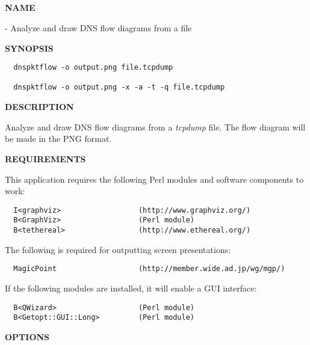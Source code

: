 \clearpage

\subsection{}

{\bf NAME}

 - Analyze and draw DNS flow diagrams from a  file

{\bf SYNOPSIS}

\begin{verbatim}
  dnspktflow -o output.png file.tcpdump

  dnspktflow -o output.png -x -a -t -q file.tcpdump
\end{verbatim}

{\bf DESCRIPTION}

Analyze and draw DNS flow diagrams from a {\it tcpdump} file.
The flow diagram will be made in the PNG format.

{\bf REQUIREMENTS}

This application requires the following Perl modules and software
components to work:

\begin{verbatim}
  I<graphviz>                  (http://www.graphviz.org/)
  B<GraphViz>                  (Perl module)
  B<tethereal>                 (http://www.ethereal.org/)
\end{verbatim}

The following is required for outputting screen presentations:

\begin{verbatim}
  MagicPoint                   (http://member.wide.ad.jp/wg/mgp/)
\end{verbatim}

If the following modules are installed, it will enable a GUI interface:

\begin{verbatim}
  B<QWizard>                   (Perl module)
  B<Getopt::GUI::Long>         (Perl module)
\end{verbatim}

{\bf OPTIONS}

